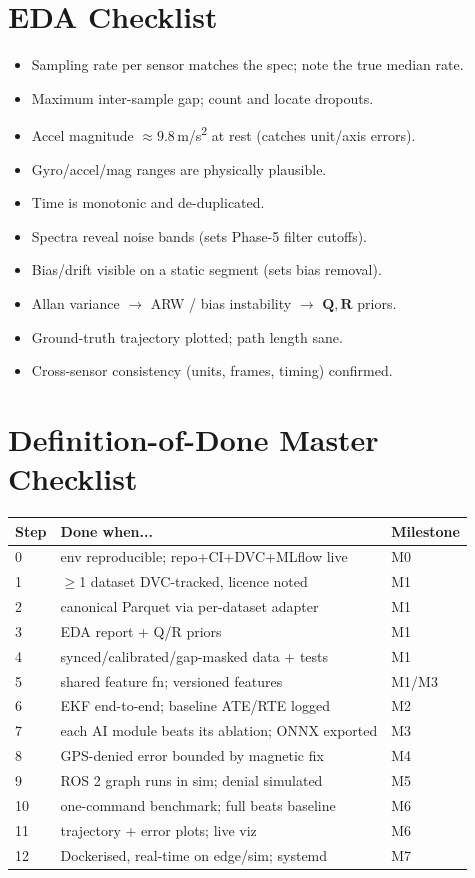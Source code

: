 \documentclass[11pt]{article}
\newcommand{\vv}[1]{\mathbf{#1}}
\begin{document}
\section{EDA Checklist}\label{sec:eda-check}
\begin{itemize}[leftmargin=1.4em,itemsep=0pt]
\item Sampling rate per sensor matches the spec; note the true median rate.
\item Maximum inter-sample gap; count and locate dropouts.
\item Accel magnitude $\approx 9.8$\,m/s\textsuperscript{2} at rest (catches unit/axis errors).
\item Gyro/accel/mag ranges are physically plausible.
\item Time is monotonic and de-duplicated.
\item Spectra reveal noise bands (sets Phase-5 filter cutoffs).
\item Bias/drift visible on a static segment (sets bias removal).
\item Allan variance $\rightarrow$ ARW / bias instability $\rightarrow$ $\vv{Q},\vv{R}$ priors.
\item Ground-truth trajectory plotted; path length sane.
\item Cross-sensor consistency (units, frames, timing) confirmed.
\end{itemize}

\section{Definition-of-Done Master Checklist}\label{sec:dod}
\begin{center}\footnotesize
\begin{tabular}{@{}p{0.8cm}p{6.0cm}p{5.4cm}@{}}
\toprule
\textbf{Step} & \textbf{Done when...} & \textbf{Milestone}\\
\midrule
0 & env reproducible; repo+CI+DVC+MLflow live & M0\\
1 & $\ge$1 dataset DVC-tracked, licence noted & M1\\
2 & canonical Parquet via per-dataset adapter & M1\\
3 & EDA report + Q/R priors & M1\\
4 & synced/calibrated/gap-masked data + tests & M1\\
5 & shared feature fn; versioned features & M1/M3\\
6 & EKF end-to-end; baseline ATE/RTE logged & M2\\
7 & each AI module beats its ablation; ONNX exported & M3\\
8 & GPS-denied error bounded by magnetic fix & M4\\
9 & ROS 2 graph runs in sim; denial simulated & M5\\
10 & one-command benchmark; full beats baseline & M6\\
11 & trajectory + error plots; live viz & M6\\
12 & Dockerised, real-time on edge/sim; systemd & M7\\
\bottomrule
\end{tabular}
\end{center}
\end{document}

